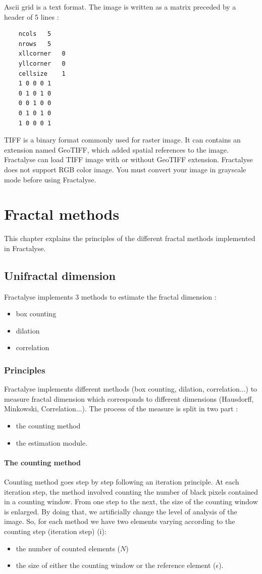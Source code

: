 \documentclass[a4paper,10pt]{report}
\begin{document}
Ascii grid is a text format. The image is written as a matrix preceded by a header of 5 lines :
\begin{Verbatim}
	ncols	5
	nrows	5
	xllcorner	0
	yllcorner	0
	cellsize	1
	1 0 0 0 1
	0 1 0 1 0
	0 0 1 0 0
	0 1 0 1 0
	1 0 0 0 1
\end{Verbatim}

TIFF is a binary format commonly used for raster image. It can contains an extension named GeoTIFF, which added spatial references to the image. Fractalyse can load TIFF image with or without GeoTIFF extension. Fractalyse does not support RGB color image. You must convert your image in grayscale mode before using Fractalyse.

\chapter{Fractal methods}
This chapter explains the principles of the different fractal methods implemented in Fractalyse. 
\section{Unifractal dimension}
Fractalyse implements 3 methods to estimate the fractal dimension :
\begin{itemize}
	\item box counting
	\item dilation
	\item correlation
\end{itemize}

\subsection{Principles}
Fractalyse implements different methods (box counting, dilation, correlation...) to measure fractal dimension which corresponds to different dimensions (Hausdorff, Minkowski, Correlation...). The process of the measure is split in two part :
\begin{itemize}
	\item the counting method
	\item the estimation module.
\end{itemize}

\subsubsection{The counting method}

Counting method goes step by step following an iteration principle. At each iteration step, the method involved counting the number of black pixels contained in a counting window. From one step to the next, the size of the counting window is enlarged. By doing that, we artificially change the level of analysis of the image. So, for each method we have two elements varying according to the counting step (iteration step) (i):
\begin{itemize}
	\item the number of counted elements ($N$)
	\item the size of either the counting window or the reference element ($\epsilon$).
\end{itemize}
	
\end{document}
